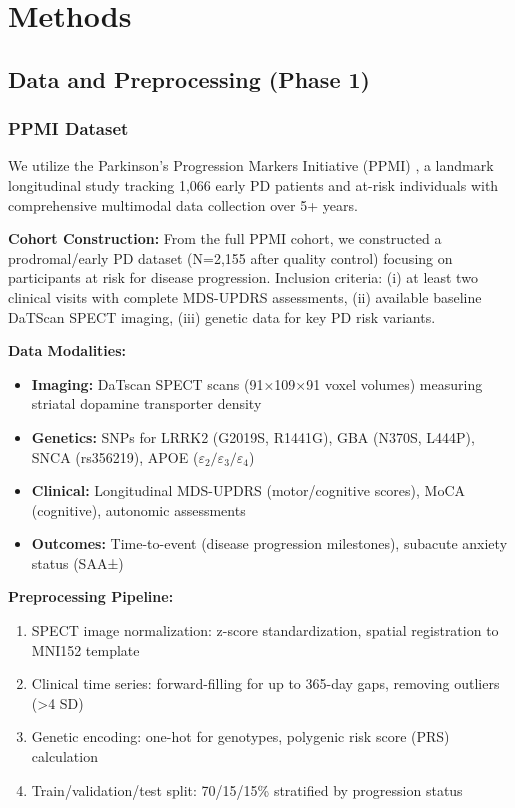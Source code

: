 \documentclass[conference]{IEEEtran}
\begin{document}
\section{Methods}
\label{sec:methods}

\subsection{Data and Preprocessing (Phase 1)}

\subsubsection{PPMI Dataset}
We utilize the Parkinson's Progression Markers Initiative (PPMI) \cite{marek2011ppmi}, a landmark longitudinal study tracking 1,066 early PD patients and at-risk individuals with comprehensive multimodal data collection over 5+ years.

\textbf{Cohort Construction:} From the full PPMI cohort, we constructed a prodromal/early PD dataset (N=2,155 after quality control) focusing on participants at risk for disease progression. Inclusion criteria: (i) at least two clinical visits with complete MDS-UPDRS assessments, (ii) available baseline DaTScan SPECT imaging, (iii) genetic data for key PD risk variants.

\textbf{Data Modalities:}
\begin{itemize}
    \item \textbf{Imaging:} DaTscan SPECT scans (91×109×91 voxel volumes) measuring striatal dopamine transporter density
    \item \textbf{Genetics:} SNPs for LRRK2 (G2019S, R1441G), GBA (N370S, L444P), SNCA (rs356219), APOE ($\varepsilon_2 / \varepsilon_3 / \varepsilon_4$)
    \item \textbf{Clinical:} Longitudinal MDS-UPDRS (motor/cognitive scores), MoCA (cognitive), autonomic assessments
    \item \textbf{Outcomes:} Time-to-event (disease progression milestones), subacute anxiety status (SAA±)
\end{itemize}

\textbf{Preprocessing Pipeline:}
\begin{enumerate}
    \item SPECT image normalization: z-score standardization, spatial registration to MNI152 template
    \item Clinical time series: forward-filling for up to 365-day gaps, removing outliers (>4 SD)
    \item Genetic encoding: one-hot for genotypes, polygenic risk score (PRS) calculation
    \item Train/validation/test split: 70/15/15\% stratified by progression status
\end{enumerate}
\end{document}
